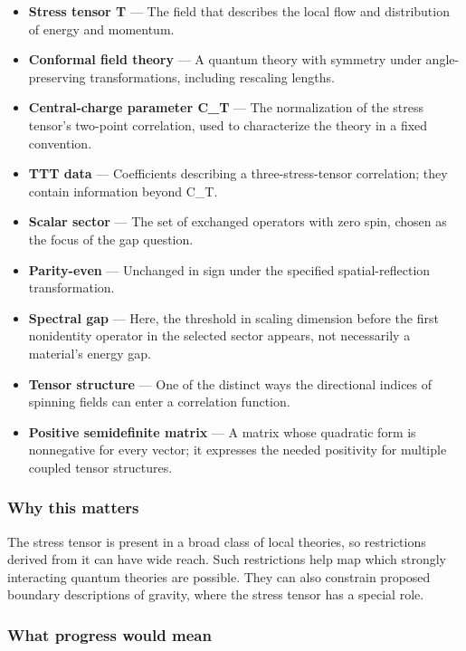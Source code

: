 \documentclass[
  11pt,
]{article}
\begin{document}
\begin{itemize}
\item
  \textbf{Stress tensor T} --- The field that describes the local flow
  and distribution of energy and momentum.
\item
  \textbf{Conformal field theory} --- A quantum theory with symmetry
  under angle-preserving transformations, including rescaling lengths.
\item
  \textbf{Central-charge parameter C\_T} --- The normalization of the
  stress tensor's two-point correlation, used to characterize the theory
  in a fixed convention.
\item
  \textbf{TTT data} --- Coefficients describing a three-stress-tensor
  correlation; they contain information beyond C\_T.
\item
  \textbf{Scalar sector} --- The set of exchanged operators with zero
  spin, chosen as the focus of the gap question.
\item
  \textbf{Parity-even} --- Unchanged in sign under the specified
  spatial-reflection transformation.
\item
  \textbf{Spectral gap} --- Here, the threshold in scaling dimension
  before the first nonidentity operator in the selected sector appears,
  not necessarily a material's energy gap.
\item
  \textbf{Tensor structure} --- One of the distinct ways the directional
  indices of spinning fields can enter a correlation function.
\item
  \textbf{Positive semidefinite matrix} --- A matrix whose quadratic
  form is nonnegative for every vector; it expresses the needed
  positivity for multiple coupled tensor structures.
\end{itemize}

\subsubsection{Why this matters}

The stress tensor is present in a broad class of local theories, so
restrictions derived from it can have wide reach. Such restrictions help
map which strongly interacting quantum theories are possible. They can
also constrain proposed boundary descriptions of gravity, where the
stress tensor has a special role.

\subsubsection{What progress would mean}
\end{document}
